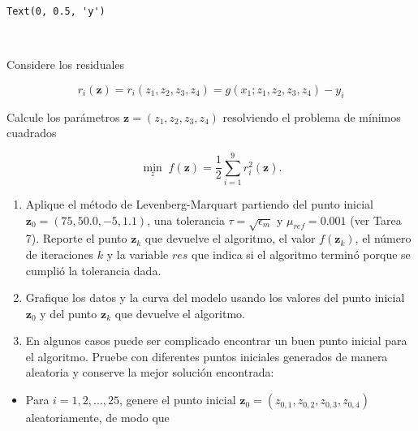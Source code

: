 \documentclass[11pt]{article}
\makeatletter
\providecommand{\tightlist}{%
      \setlength{\itemsep}{0pt}\setlength{\parskip}{0pt}}
\newcommand{\boxspacing}{\kern\kvtcb@left@rule\kern\kvtcb@boxsep}
\newcommand{\prompt}[4]{
        {\ttfamily\llap{{\color{#2}[#3]:\hspace{3pt}#4}}\vspace{-\baselineskip}}
    }
\makeatother
\begin{document}
            \begin{tcolorbox}[breakable, size=fbox, boxrule=.5pt, pad at break*=1mm, opacityfill=0]
\prompt{Out}{outcolor}{3}{\boxspacing}
\begin{Verbatim}[commandchars=\\\{\}]
Text(0, 0.5, 'y')
\end{Verbatim}
\end{tcolorbox}
        
    \begin{center}
    \end{center}
    { \hspace*{\fill} \\}
    
    Considere los residuales

\[ r_i(\mathbf{z}) = r_i(z_1, z_2, z_3, z_4) = g(x_1; z_1, z_2, z_3, z_4) - y_i \]

Calcule los parámetros \(\mathbf{z} = (z_1, z_2, z_3, z_4)\) resolviendo
el problema de mínimos cuadrados

\[ \min_{z} \; f(\mathbf{z}) = \frac{1}{2}\sum_{i=1}^9 r_i^2(\mathbf{z}). \]

\begin{enumerate}
\def\labelenumi{\arabic{enumi}.}
\tightlist
\item
  Aplique el método de Levenberg-Marquart partiendo del punto inicial
  \(\mathbf{z}_0 = (75, 50.0, -5, 1.1)\), una tolerancia
  \(\tau=\sqrt{\epsilon_m}\) y \(\mu_{ref}=0.001\) (ver Tarea 7).
  Reporte el punto \(\mathbf{z}_k\) que devuelve el algoritmo, el valor
  \(f(\mathbf{z}_k)\), el número de iteraciones \(k\) y la variable
  \(res\) que indica si el algoritmo terminó porque se cumplió la
  tolerancia dada.
\item
  Grafique los datos y la curva del modelo usando los valores del punto
  inicial \(\mathbf{z}_0\) y del punto \(\mathbf{z}_k\) que devuelve el
  algoritmo.
\item
  En algunos casos puede ser complicado encontrar un buen punto inicial
  para el algoritmo. Pruebe con diferentes puntos iniciales generados de
  manera aleatoria y conserve la mejor solución encontrada:
\end{enumerate}

\begin{itemize}
\tightlist
\item
  Para \(i=1, 2, ..., 25\), genere el punto inicial
  \(\mathbf{z}_0 = (z_{0,1}, z_{0,2}, z_{0,3}, z_{0,4})\)
  aleatoriamente, de modo que
\end{itemize}
\end{document}
